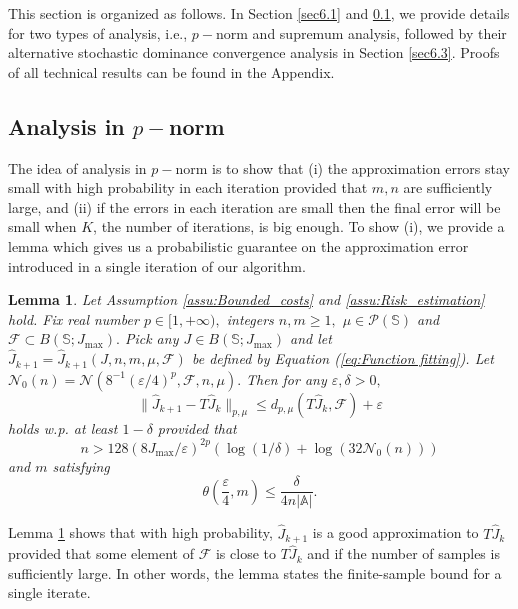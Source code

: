 \documentclass[12pt,technote,onecolumn]{IEEEtran}
\newtheorem{lemma}{Lemma}
\begin{document}
This section is organized as follows. In Section \ref{sec6.1} and \ref{sec6.2}, we provide
details for two types of analysis, i.e., $p-$norm and supremum analysis,
followed by their alternative stochastic dominance convergence analysis
in Section \ref{sec6.3}. Proofs of all technical results can be found in the Appendix.

\subsection{Analysis in $p-$norm}\label{sec6.2}

The idea of analysis in $p-$norm is to show that (i) the approximation
errors stay small with high probability in each iteration provided
that $m,n$ are sufficiently large, and (ii) if the errors in each
iteration are small then the final error will be small when $K$,
the number of iterations, is big enough. To show (i), we provide a
lemma which gives us a probabilistic guarantee on the approximation
error introduced in a single iteration of our algorithm. 
\begin{lemma}
	\label{lem:Error each iteration} Let Assumption \ref{assu:Bounded_costs}
	and \ref{assu:Risk_estimation} hold. Fix real number $p\in[1,+\infty),$
	integers $n,m\geq1,$ $\mu\in\mathcal{P}\left(\mathbb{S}\right)$
	and $\mathcal{F}\subset B\left(\mathbb{S};J_{\max}\right).$
	Pick any $J\in B\left(\mathbb{S};J_{\max}\right)$ and let $\widehat{J}_{k+1}=\widehat{J}_{k+1}\left(J,n,m,\mu,\mathcal{F}\right)$
	be defined by Equation (\ref{eq:Function fitting}). Let $\mathcal{N}_{0}\left(n\right)=\mathcal{N}\left(8^{-1}\left({\varepsilon}/{4}\right)^{p},\mathcal{F},n,\mu\right).$
	Then for any $\varepsilon,\delta>0,$	
	\[
	\|\widehat{J}_{k+1}-T\widehat{J}_{k}\|_{p,\mu}\leq d_{p,\mu}(T\widehat{J}_{k},\mathcal{F})+\varepsilon
	\]
	holds w.p. at least $1-\delta$ provided that	
	\[
	n>128\left({8J_{\max}}/{\varepsilon}\right)^{2p}\left(\log\left(1/\delta\right)+\log\left(32\mathcal{N}_{0}\left(n\right)\right)\right)
	\]
	and $m$ satisfying	
	$$
	\theta\left(\frac{\varepsilon}{4},m\right)\leq\frac{\delta}{4n\left|\mathbb{A}\right|}.
	$$	
\end{lemma}

Lemma \ref{lem:Error each iteration} shows that with high probability,
$\widehat{J}_{k+1}$ is a good approximation to $T\widehat{J}_{k}$
provided that some element of $\mathcal{F}$
is close to $T\widehat{J}_{k}$ and if the number of samples is sufficiently
large. In other words, the lemma states the finite-sample bound for
a single iterate. 
\end{document}
